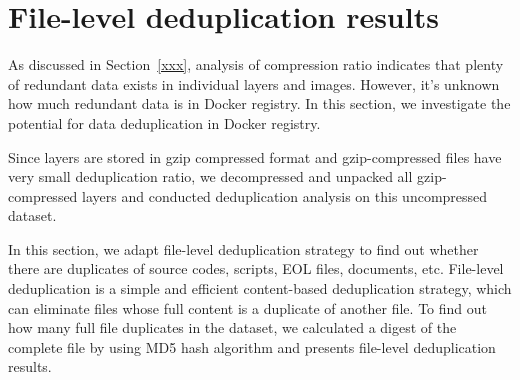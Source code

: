 \section{File-level deduplication results}
\label{sec:redundant_files}


As discussed in Section~\ref{xxx}, analysis of compression ratio indicates that plenty of redundant data exists in individual layers and images. However, it's unknown how much redundant data is in Docker registry. In this section, we investigate the potential for data deduplication in Docker registry. 

Since layers are stored in gzip compressed format and gzip-compressed files have very small deduplication ratio\cite{xxxx}, we decompressed and unpacked all gzip-compressed layers and conducted deduplication analysis on this uncompressed dataset. 

In this section, we adapt file-level deduplication strategy to find out whether there are duplicates of source codes, scripts, EOL files, documents, etc. File-level deduplication is a simple and efficient content-based deduplication strategy, which can eliminate files whose full content is a duplicate of another file. To find out how many full file duplicates in the dataset, we calculated a digest of the complete file by using MD5 hash algorithm and presents file-level deduplication results.



